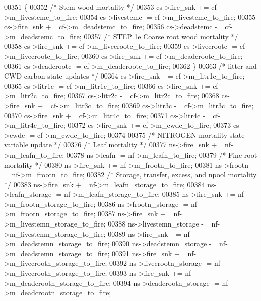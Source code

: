 \begin{DoxyCode}
00351     \{
00352         \textcolor{comment}{/*    Stem wood mortality */}
00353         cs->fire\_snk   += cf->m\_livestemc\_to\_fire;
00354         cs->livestemc  -= cf->m\_livestemc\_to\_fire;
00355         cs->fire\_snk   += cf->m\_deadstemc\_to\_fire;
00356         cs->deadstemc  -= cf->m\_deadstemc\_to\_fire;
00357         \textcolor{comment}{/* STEP 1e  Coarse root wood mortality */}
00358         cs->fire\_snk   += cf->m\_livecrootc\_to\_fire;
00359         cs->livecrootc -= cf->m\_livecrootc\_to\_fire;
00360         cs->fire\_snk   += cf->m\_deadcrootc\_to\_fire;
00361         cs->deadcrootc -= cf->m\_deadcrootc\_to\_fire;
00362     \}
00363     \textcolor{comment}{/* litter and CWD carbon state updates */}
00364     cs->fire\_snk += cf->m\_litr1c\_to\_fire;
00365     cs->litr1c   -= cf->m\_litr1c\_to\_fire;
00366     cs->fire\_snk += cf->m\_litr2c\_to\_fire;
00367     cs->litr2c   -= cf->m\_litr2c\_to\_fire;
00368     cs->fire\_snk += cf->m\_litr3c\_to\_fire;
00369     cs->litr3c   -= cf->m\_litr3c\_to\_fire;
00370     cs->fire\_snk += cf->m\_litr4c\_to\_fire;
00371     cs->litr4c   -= cf->m\_litr4c\_to\_fire;
00372     cs->fire\_snk += cf->m\_cwdc\_to\_fire;
00373     cs->cwdc     -= cf->m\_cwdc\_to\_fire;
00374     
00375     \textcolor{comment}{/* NITROGEN mortality state variable update */}
00376     \textcolor{comment}{/*    Leaf mortality */}
00377     ns->fire\_snk       += nf->m\_leafn\_to\_fire;
00378     ns->leafn          -= nf->m\_leafn\_to\_fire;
00379     \textcolor{comment}{/*    Fine root mortality */}
00380     ns->fire\_snk       += nf->m\_frootn\_to\_fire;
00381     ns->frootn         -= nf->m\_frootn\_to\_fire;
00382     \textcolor{comment}{/*    Storage, transfer, excess, and npool mortality */}
00383     ns->fire\_snk            += nf->m\_leafn\_storage\_to\_fire;
00384     ns->leafn\_storage       -= nf->m\_leafn\_storage\_to\_fire;
00385     ns->fire\_snk            += nf->m\_frootn\_storage\_to\_fire;
00386     ns->frootn\_storage      -= nf->m\_frootn\_storage\_to\_fire;
00387     ns->fire\_snk            += nf->m\_livestemn\_storage\_to\_fire;
00388     ns->livestemn\_storage   -= nf->m\_livestemn\_storage\_to\_fire;
00389     ns->fire\_snk            += nf->m\_deadstemn\_storage\_to\_fire;
00390     ns->deadstemn\_storage   -= nf->m\_deadstemn\_storage\_to\_fire;
00391     ns->fire\_snk            += nf->m\_livecrootn\_storage\_to\_fire;
00392     ns->livecrootn\_storage  -= nf->m\_livecrootn\_storage\_to\_fire;
00393     ns->fire\_snk            += nf->m\_deadcrootn\_storage\_to\_fire;
00394     ns->deadcrootn\_storage  -= nf->m\_deadcrootn\_storage\_to\_fire;

\end{DoxyCode}
